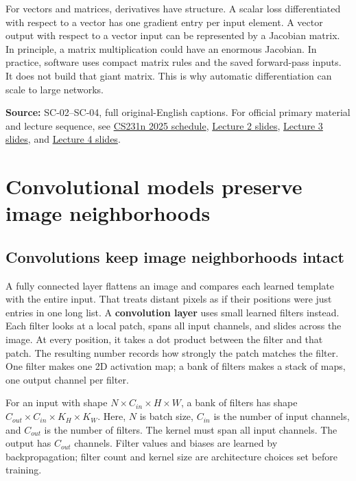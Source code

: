For vectors and matrices, derivatives have structure. A scalar loss differentiated with respect to a vector has one gradient entry per input element. A vector output with respect to a vector input can be represented by a Jacobian matrix. In principle, a matrix multiplication could have an enormous Jacobian. In practice, software uses compact matrix rules and the saved forward-pass inputs. It does not build that giant matrix. This is why automatic differentiation can scale to large networks.

\textbf{Source:} SC-02--SC-04, full original-English captions. For official primary material and lecture sequence, see \href{https://cs231n.stanford.edu/2025/schedule.html}{CS231n 2025 schedule}, \href{https://cs231n.stanford.edu/slides/2025/lecture_2.pdf}{Lecture 2 slides}, \href{https://cs231n.stanford.edu/slides/2025/lecture_3.pdf}{Lecture 3 slides}, and \href{https://cs231n.stanford.edu/slides/2025/lecture_4.pdf}{Lecture 4 slides}.

\section{Convolutional models preserve image neighborhoods}\label{04-visual-computing-ii-ch031-convolutional-models-preserve-image-neighborhoods}

\subsection{Convolutions keep image neighborhoods intact}\label{04-visual-computing-ii-ch031-convolutions-keep-image-neighborhoods-intact}

A fully connected layer flattens an image and compares each learned template with the entire input. That treats distant pixels as if their positions were just entries in one long list. A \textbf{convolution layer} uses small learned filters instead. Each filter looks at a local patch, spans all input channels, and slides across the image. At every position, it takes a dot product between the filter and that patch. The resulting number records how strongly the patch matches the filter. One filter makes one 2D activation map; a bank of filters makes a stack of maps, one output channel per filter.

For an input with shape \(N\times C_{in}\times H\times W\), a bank of filters has shape \(C_{out}\times C_{in}\times K_H\times K_W\). Here, \(N\) is batch size, \(C_{in}\) is the number of input channels, and \(C_{out}\) is the number of filters. The kernel must span all input channels. The output has \(C_{out}\) channels. Filter values and biases are learned by backpropagation; filter count and kernel size are architecture choices set before training.

